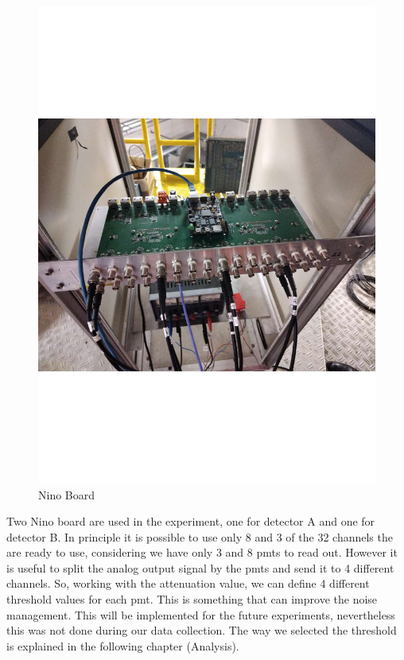 \begin{figure}[hbtp]
 
 \centering
 \includegraphics[scale= 0.4]{figures/NINO.pdf}
 \caption{Nino Board}
 \label{fig:NinoBoard}
 \end{figure}

Two Nino board are used in the experiment, one for detector A and one for detector B. In principle it is possible to use only 8 and 3 of the 32 channels the are ready to use, considering we have only 3 and 8 pmts to read out. However it is useful to split the analog output signal by the pmts and send it to 4 different channels. So, working with the attenuation value, we can define 4 different threshold values for each pmt. This is something that can improve the noise management. This will be implemented for the future experiments, nevertheless this was not done during our data collection.
The way we selected the threshold is explained in the following chapter (Analysis).
